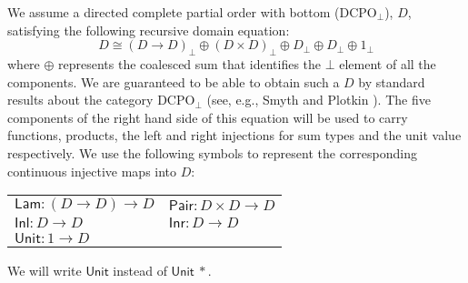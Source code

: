 \documentclass[natbib]{sigplanconf}
\newcommand{\semCons}[1]{\mathsf{#1}}
\begin{document}
We assume a directed complete partial order with bottom
($\mathrm{DCPO}_\bot$), $D$, satisfying the following recursive domain
equation:
\begin{displaymath}
  D \cong (D \to D)_\bot \oplus (D \times D)_\bot \oplus D_\bot \oplus D_\bot \oplus 1_\bot
\end{displaymath}
where $\oplus$ represents the coalesced sum that identifies the $\bot$
element of all the components. We are guaranteed to be able to obtain
such a $D$ by standard results about the category $\mathrm{DCPO}_\bot$
(see, e.g., Smyth and Plotkin \cite{smyth82category}). The five
components of the right hand side of this equation will be used to
carry functions, products, the left and right injections for sum types
and the unit value respectively. We use the following symbols to
represent the corresponding continuous injective maps into $D$:
\begin{center}
  \begin{tabular}{ll}
    $\semCons{Lam} : (D \to D) \to D$ & $\semCons{Pair} : D \times D \to D$ \\
    $\semCons{Inl} : D \to D$ & $\semCons{Inr} : D \to D$ \\
    $\semCons{Unit} : 1 \to D$
  \end{tabular}  
\end{center}
We will write $\semCons{Unit}$ instead of $\semCons{Unit}\ *$.
\end{document}
